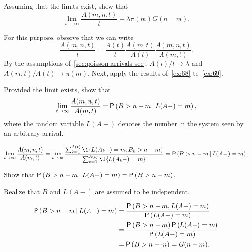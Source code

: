 \begin{exercise}
Assuming that the limits exist, show that
\begin{equation*}
\lim_{t\to\infty} \frac{A(m,n,t)}t = \lambda \pi(m) G(n-m).
\end{equation*}
\begin{solution}
For this purpose, observe that we can write
\begin{equation}\label{eq:16}
 \frac{A(m,n,t)}t = \frac{A(t)}t \frac{A(m,t)}{A(t)}\frac{A(m,n,t)}{A(m,t)}.
\end{equation}
By the assumptions of~\cref{sec:poisson-arrivals-see}, $A(t)/t\to\lambda$ and $A(m,t)/A(t)\to\pi(m)$.
Next, apply the results of~\cref{ex:68} to~\cref{ex:69}.
\end{solution}
\end{exercise}

\begin{extra}
Provided the limit exists, show that
\begin{equation}\label{eq:1332}
\lim_{t\to\infty} \frac{A(m,n,t)}{A(m,t)} =\P{B>n-m\given L(A-)=m},
\end{equation}
where the random variable $L(A-)$ denotes the number in the system seen by an arbitrary arrival.
\begin{solution}
\begin{equation*}
\lim_{t\to\infty} \frac{A(m,n,t)}{A(m,t)} = 
\lim_{t\to\infty} \frac{\sum_{k=1}^{A(t)}\1{L(A_k-) = m, B_k > n-m}}
{\sum_{k=1}^{A(t)}\1{L(A_k-) = m}}=\P{B>n-m\given L(A-)=m},
\end{equation*}
\end{solution}
\end{extra}


\begin{extra}
Show that $\P{B>n-m\given L(A-)=m}=\P{B>n-m}$.
\begin{hint}
 Realize that $B$ and $L(A-)$ are assumed to be independent.
\end{hint}
\begin{solution}
\begin{equation*}
 \begin{split}
\P{B>n-m\given L(A-)=m} &=
\frac{\P{B>n-m,L(A-)=m}}{\P{L(A-)=m}}\\
&=\frac{\P{B>n-m}\P{L(A-)=m}}{\P{L(A-)=m}} \\
&= \P{B>n-m} =G(n-m).
 \end{split}
\end{equation*}
\end{solution}
\end{extra}

